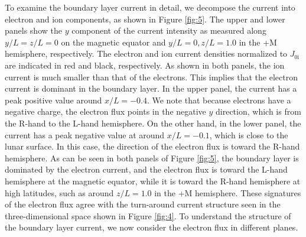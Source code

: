 \documentclass[draft,jgrga]{agutex2015}
\begin{document}
\begin{article}
To examine the boundary layer current in detail, 
we decompose the current into electron and ion components,  
as shown in Figure \ref{fig:5}. 
The upper and lower panels show the $y$ component 
of the current intensity as 
measured along $y/L=z/L=0$ on the magnetic equator 
and $y/L=0, z/L=1.0$ in the +M hemisphere, respectively.
The electron and ion current densities normalized to $J_\mathrm{0i}$ are 
indicated in red and black, respectively. 
As shown in both panels, 
the ion current is much smaller than that of the electrons. 
This implies that the electron current is dominant in the boundary layer.
In the upper panel,
the current has a peak positive value around $x/L=-0.4$. 
We note that because electrons have a negative charge, the 
electron flux points in the negative $y$ direction, which is 
from the R-hand to the L-hand hemisphere. 
On the other hand, in the lower panel, 
the current has a peak negative value at around $x/L=-0.1$, 
which is close to the lunar surface. 
In this case, the direction of the electron flux is toward the R-hand hemisphere.  
As can be seen in both panels of Figure \ref{fig:5}, 
the boundary layer is dominated by the electron current, 
and the electron flux is
toward the L-hand hemisphere at the magnetic equator, while
it is toward the R-hand hemisphere at high latitudes, such as 
around $z/L =1.0$ in the +M hemisphere.
These signatures of the electron flux agree with the
turn-around current structure seen in the three-dimensional space 
shown in Figure \ref{fig:4}.
To understand the structure of the boundary layer current, 
we now consider the electron flux in different planes.



\end{article}
\end{document}

